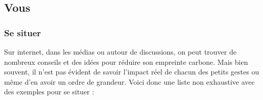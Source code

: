 \hypertarget{vous}{%
\subsection{Vous}\label{vous}}

\hypertarget{se-situer}{%
\subsubsection{Se situer}\label{se-situer}}

Sur internet, dans les médias ou autour de discussions, on peut trouver
de nombreux conseils et des idées pour réduire son empreinte carbone.
Mais bien souvent, il n'est pas évident de savoir l'impact réel de
chacun des petits gestes ou même d'en avoir un ordre de grandeur. Voici
donc une liste non exhaustive avec des exemples pour se situer :

